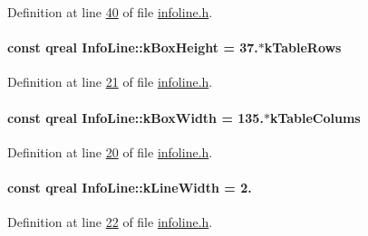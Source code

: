 Definition at line \hyperlink{infoline_8h_source_l00040}{40} of file \hyperlink{infoline_8h_source}{infoline.\+h}.

\hypertarget{class_info_line_a279cafcac8d844a00bd27dde524102dd}{}
\paragraph[{k\+Box\+Height}]{\setlength{\rightskip}{0pt plus 5cm}const qreal Info\+Line\+::k\+Box\+Height = 37.$\ast${\bf k\+Table\+Rows}\hspace{0.3cm}{\ttfamily [static]}}\label{class_info_line_a279cafcac8d844a00bd27dde524102dd}


Definition at line \hyperlink{infoline_8h_source_l00021}{21} of file \hyperlink{infoline_8h_source}{infoline.\+h}.

\hypertarget{class_info_line_af71f2b91ea77398bd770b973b71e2896}{}
\paragraph[{k\+Box\+Width}]{\setlength{\rightskip}{0pt plus 5cm}const qreal Info\+Line\+::k\+Box\+Width = 135.$\ast${\bf k\+Table\+Colums}\hspace{0.3cm}{\ttfamily [static]}}\label{class_info_line_af71f2b91ea77398bd770b973b71e2896}


Definition at line \hyperlink{infoline_8h_source_l00020}{20} of file \hyperlink{infoline_8h_source}{infoline.\+h}.

\hypertarget{class_info_line_a18390d54c56cd68cf6e767a5df7404d8}{}
\paragraph[{k\+Line\+Width}]{\setlength{\rightskip}{0pt plus 5cm}const qreal Info\+Line\+::k\+Line\+Width = 2.\hspace{0.3cm}{\ttfamily [static]}}\label{class_info_line_a18390d54c56cd68cf6e767a5df7404d8}


Definition at line \hyperlink{infoline_8h_source_l00022}{22} of file \hyperlink{infoline_8h_source}{infoline.\+h}.

\hypertarget{class_info_line_a82acf816389449ddce739e8abb6e0fdc}{}
